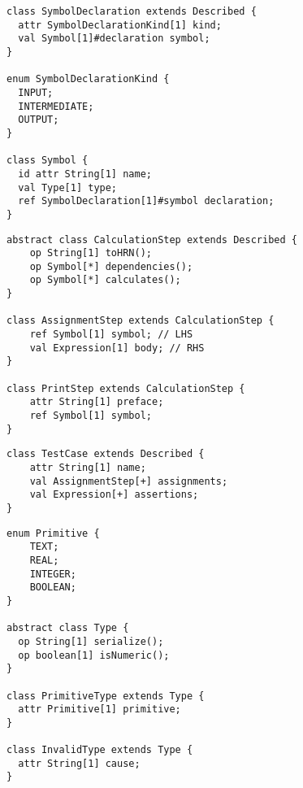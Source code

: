 \documentclass[11pt,fleqn]{article}
\begin{document}
\begin{lstlisting}[caption={Symbol Declarations},label={lst:symbol-declarations}]
class SymbolDeclaration extends Described {
  attr SymbolDeclarationKind[1] kind;
  val Symbol[1]#declaration symbol;
}

enum SymbolDeclarationKind {
  INPUT;
  INTERMEDIATE;
  OUTPUT;
}

class Symbol {
  id attr String[1] name;
  val Type[1] type;
  ref SymbolDeclaration[1]#symbol declaration;
}
\end{lstlisting}

\begin{lstlisting}[caption={Calculation Steps},label={lst:calculation-steps}]
abstract class CalculationStep extends Described {
	op String[1] toHRN();
	op Symbol[*] dependencies();
	op Symbol[*] calculates();
}

class AssignmentStep extends CalculationStep {
	ref Symbol[1] symbol; // LHS
	val Expression[1] body; // RHS
}

class PrintStep extends CalculationStep {
	attr String[1] preface;
	ref Symbol[1] symbol;
}
\end{lstlisting}

\begin{lstlisting}[caption={Test Case},label={lst:test-case}]
class TestCase extends Described {
	attr String[1] name;
	val AssignmentStep[+] assignments;
	val Expression[+] assertions;
}
\end{lstlisting}

\begin{lstlisting}[caption={Type Universe},label={lst:type-universe}]
enum Primitive {
	TEXT;
	REAL;
	INTEGER;
	BOOLEAN;
}

abstract class Type {
  op String[1] serialize();
  op boolean[1] isNumeric();
}

class PrimitiveType extends Type {
  attr Primitive[1] primitive;
}

class InvalidType extends Type {
  attr String[1] cause;
}
\end{lstlisting}
\end{document}
